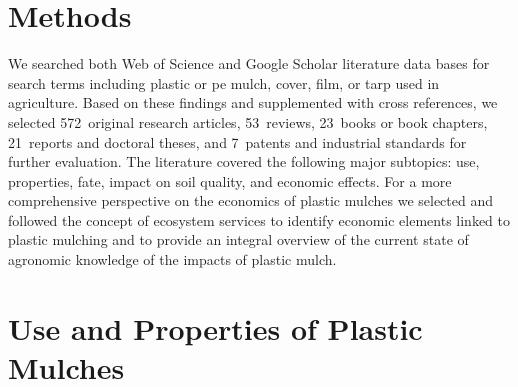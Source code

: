 \section{Methods}
\label{sec:plastic-mulching:methods}

We searched both Web of Science and Google Scholar literature data bases for search terms including plastic or \ac{pe} mulch, cover, film, or tarp used in agriculture. Based on these findings and supplemented with cross references, we selected \num{572}~original research articles, \num{53}~reviews, \num{23}~books or book chapters, \num{21}~reports and doctoral theses, and \num{7}~patents and industrial standards for further evaluation. The literature covered the following major subtopics: use, properties, fate, impact on soil quality, and economic effects. For a more comprehensive perspective on the economics of plastic mulches we selected and followed the concept of ecosystem services \citep{MillenniumEcosystemAssessmentEcosystems2005} to identify economic elements linked to plastic mulching and to provide an integral overview of the current state of agronomic knowledge of the impacts of plastic mulch.

\section{Use and Properties of Plastic Mulches}
\label{sec:plastic-mulching:use-and-properties}

